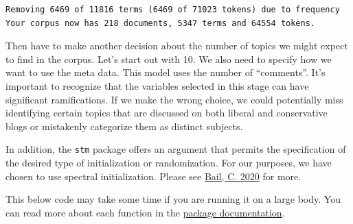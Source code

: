 \documentclass[
  letterpaper,
  DIV=11,
  numbers=noendperiod]{scrreprt}
\newenvironment{Shaded}{\begin{snugshade}}{\end{snugshade}}
\newcommand{\AttributeTok}[1]{\textcolor[rgb]{0.40,0.45,0.13}{#1}}
\newcommand{\ConstantTok}[1]{\textcolor[rgb]{0.56,0.35,0.01}{#1}}
\newcommand{\DecValTok}[1]{\textcolor[rgb]{0.68,0.00,0.00}{#1}}
\newcommand{\FunctionTok}[1]{\textcolor[rgb]{0.28,0.35,0.67}{#1}}
\newcommand{\NormalTok}[1]{\textcolor[rgb]{0.00,0.23,0.31}{#1}}
\newcommand{\OtherTok}[1]{\textcolor[rgb]{0.00,0.23,0.31}{#1}}
\newcommand{\SpecialCharTok}[1]{\textcolor[rgb]{0.37,0.37,0.37}{#1}}
\newcommand{\StringTok}[1]{\textcolor[rgb]{0.13,0.47,0.30}{#1}}
\begin{document}
\begin{verbatim}
Removing 6469 of 11816 terms (6469 of 71023 tokens) due to frequency 
Your corpus now has 218 documents, 5347 terms and 64554 tokens.
\end{verbatim}

\begin{Shaded}
\end{Shaded}

Then have to make another decision about the number of topics we might
expect to find in the corpus. Let's start out with 10. We also need to
specify how we want to use the meta data. This model uses the number of
``comments''. It's important to recognize that the variables selected in
this stage can have significant ramifications. If we make the wrong
choice, we could potentially miss identifying certain topics that are
discussed on both liberal and conservative blogs or mistakenly
categorize them as distinct subjects.

In addition, the \texttt{stm} package offers an argument that permits
the specification of the desired type of initialization or
randomization. For our purposes, we have chosen to use spectral
initialization. Please see
\href{https://sicss.io/2020/materials/day3-text-analysis/topic-modeling/rmarkdown/Topic_Modeling.html}{Bail,
C. 2020} for more.

This below code may take some time if you are running it on a large
body. You can read more about each function in the
\href{https://www.rdocumentation.org/packages/stm/versions/1.3.6/topics/stm}{package
documentation}.

\begin{Shaded}
\end{Shaded}
\end{document}
